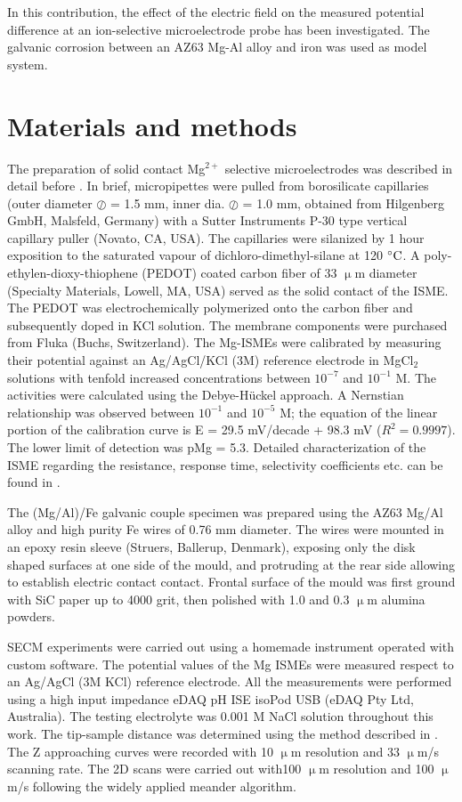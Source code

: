 \documentclass[3p]{elsarticle}
\begin{document}
In this contribution, the effect of the electric field on the measured potential difference at an ion-selective microelectrode probe has been investigated. The galvanic corrosion between an AZ63 Mg-Al alloy and iron was used as model system.

\section{Materials and methods}

The preparation of solid contact Mg$^{2+}$ selective microelectrodes was described in detail before \cite{overmg3}. In brief, micropipettes were pulled from borosilicate capillaries (outer diameter $\oslash$ = 1.5 mm, inner dia. $\oslash$ = 1.0 mm, obtained from Hilgenberg GmbH, Malsfeld, Germany) with a Sutter Instruments P-30 type vertical capillary puller (Novato, CA, USA). The capillaries were silanized by 1 hour exposition to the saturated vapour of dichloro-dimethyl-silane at 120 $\celsius$. A poly-ethylen-dioxy-thiophene (PEDOT) coated carbon fiber of 33 $\upmu$m diameter (Specialty Materials, Lowell, MA, USA) served as the solid contact of the ISME. The PEDOT was electrochemically polymerized onto the carbon fiber and subsequently doped in KCl solution. The membrane components were purchased from Fluka (Buchs, Switzerland).
The Mg-ISMEs were calibrated by measuring their potential against an Ag/AgCl/KCl (3M) reference electrode in MgCl$_2$ solutions with tenfold increased concentrations between $10^{-7}$ and $10^{-1}$ M. The activities were calculated using the Debye-Hückel approach. A Nernstian relationship was observed between $10^{-1}$ and $10^{-5}$ M; the equation of the linear portion of the calibration curve is E = 29.5 mV/decade + 98.3 mV ($R^2=0.9997$). The lower limit of detection was pMg = 5.3. Detailed characterization of the ISME regarding the resistance, response time, selectivity coefficients etc. can be found in \cite{overmg3, mihaela mg}.

The (Mg/Al)/Fe galvanic couple specimen was prepared using the AZ63 Mg/Al alloy and high purity Fe wires of 0.76 mm diameter. The wires were mounted in an epoxy resin sleeve (Struers, Ballerup, Denmark), exposing only the disk shaped surfaces at one side of the mould, and protruding at the rear side allowing to establish electric contact contact. Frontal surface of the mould was first ground with SiC paper up to 4000 grit, then polished with 1.0 and 0.3 $\upmu$m alumina powders.

SECM experiments were carried out using a homemade instrument operated with custom software. The potential values of the Mg ISMEs were measured respect to an Ag/AgCl (3M KCl) reference electrode. All the measurements were performed using a high input impedance eDAQ pH ISE isoPod USB (eDAQ Pty Ltd, Australia). The testing electrolyte was 0.001 M NaCl solution throughout this work. The tip-sample distance was determined using the method described in \cite{overmg3}. The Z approaching curves were recorded with 10 $\upmu$m resolution and 33 $\upmu$m/s scanning rate. The 2D scans were carried out with100 $\upmu$m resolution and 100 $\upmu$m/s following the widely applied meander algorithm.
\end{document}
